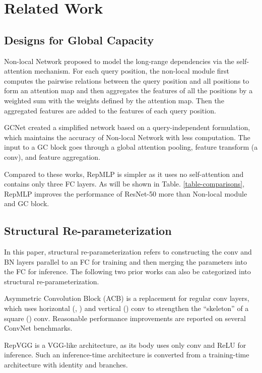 \documentclass[10pt,twocolumn,letterpaper]{article}
\begin{document}
\section{Related Work}

\subsection{Designs for Global Capacity}

Non-local Network \cite{wang2018non} proposed to model the long-range dependencies via the self-attention mechanism. For each query position, the non-local module first computes the pairwise relations between the query position and all positions to form an attention map and then aggregates the features of all the positions by a weighted sum with the weights defined by the attention map. Then the aggregated features are added to the features of each query position.

GCNet \cite{cao2019gcnet} created a simplified network based on a query-independent formulation, which maintains the accuracy of Non-local Network with less computation. The input to a GC block goes through a global attention pooling, feature transform (a  conv), and feature aggregation. 

Compared to these works, RepMLP is simpler as it uses no self-attention and contains only three FC layers. As will be shown in Table. \ref{table-comparisons}, RepMLP improves the performance of ResNet-50 more than Non-local module and GC block.


\subsection{Structural Re-parameterization}

In this paper, structural re-parameterization refers to constructing the conv and BN layers parallel to an FC for training and then merging the parameters into the FC for inference. The following two prior works can also be categorized into structural re-parameterization.

Asymmetric Convolution Block (ACB) \cite{ding2019acnet} is a replacement for regular conv layers, which uses horizontal (\eg, ) and vertical () conv to strengthen the ``skeleton'' of a square () conv. Reasonable performance improvements are reported on several ConvNet benchmarks.



RepVGG \cite{ding2021repvgg} is a VGG-like architecture, as its body uses only  conv and ReLU for inference. Such an inference-time architecture is converted from a training-time architecture with identity and  branches.
\end{document}
